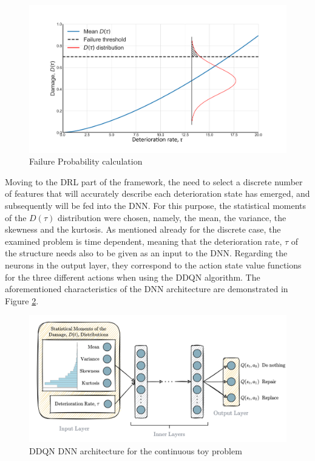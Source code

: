 \begin{figure}[H]
    \centering
	\includegraphics[width=0.85\linewidth]{Figures/failureProb.jpg}
	\caption[Failure Probability calculation]{Failure Probability calculation \protect\footnotemark}
	\label{failProb}
\end{figure}



Moving to the \gls{DRL} part of the framework, the need to select a discrete number of features that will accurately describe each deterioration state has emerged, and subsequently will be fed into the \gls{DNN}. For this purpose, the statistical moments of the $D(\tau)$ distribution were chosen, namely, the mean, the variance, the skewness and the kurtosis. As mentioned already for the discrete case, the examined problem is time dependent, meaning that the deterioration rate, $\tau$ of the structure needs also to be given as an input to the \gls{DNN}. Regarding the neurons in the output layer, they correspond to the action state value functions for the three different actions when using the \gls{DDQN} algorithm. The aforementioned characteristics of the \gls{DNN} architecture are demonstrated in Figure \ref{dnnToyContDDQN}.

\begin{figure}[H]
    \centering
	\includegraphics[width=\linewidth]{Figures/dnnToyContDDQN.png}
	\caption{\gls{DDQN} \gls{DNN} architecture for the continuous toy problem}
	\label{dnnToyContDDQN}
\end{figure}

